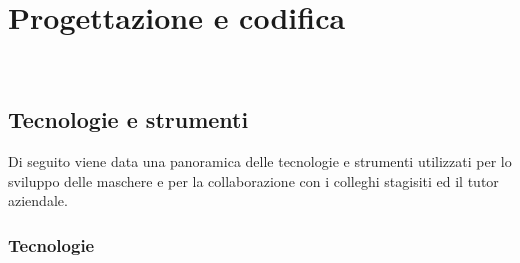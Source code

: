 
\chapter{Progettazione e codifica}
\label{cap:progettazione-codifica}

\\

\section{Tecnologie e strumenti}
\label{sec:tecnologie-strumenti}

Di seguito viene data una panoramica delle tecnologie e strumenti utilizzati per lo sviluppo delle maschere e per la collaborazione con i colleghi stagisiti ed il tutor aziendale.

\subsection{Tecnologie}

